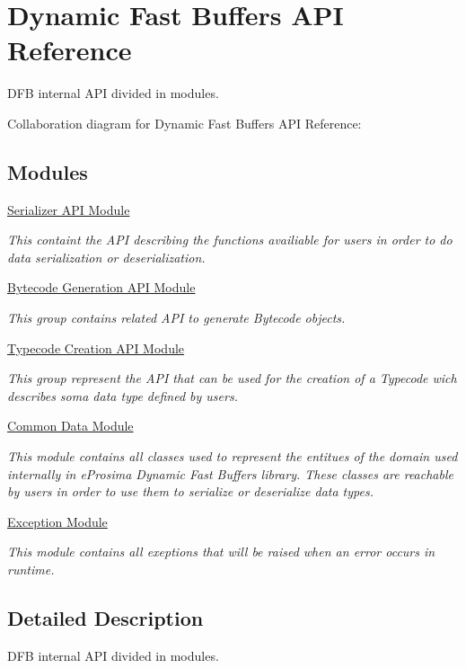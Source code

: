 \hypertarget{group___d_y_n_a_m_i_c_f_a_s_t_b_u_f_f_e_r_s_a_p_i_r_e_f_e_r_e_n_c_e}{\section{Dynamic Fast Buffers A\-P\-I Reference}
\label{group___d_y_n_a_m_i_c_f_a_s_t_b_u_f_f_e_r_s_a_p_i_r_e_f_e_r_e_n_c_e}
}


D\-F\-B internal A\-P\-I divided in modules.  


Collaboration diagram for Dynamic Fast Buffers A\-P\-I Reference\-:
\subsection*{Modules}
\begin{DoxyCompactItemize}
\item 
\hyperlink{group___s_e_r_i_a_l_i_z_e_r_a_p_i_m_o_d_u_l_e}{Serializer A\-P\-I Module}
\begin{DoxyCompactList}\small\item\em This containt the A\-P\-I describing the functions availiable for users in order to do data serialization or deserialization. \end{DoxyCompactList}\item 
\hyperlink{group___b_y_t_e_c_o_d_e_a_p_i_m_o_d_u_l_e}{Bytecode Generation A\-P\-I Module}
\begin{DoxyCompactList}\small\item\em This group contains related A\-P\-I to generate Bytecode objects. \end{DoxyCompactList}\item 
\hyperlink{group___t_y_p_e_c_o_d_e_a_p_i_m_o_d_u_l_e}{Typecode Creation A\-P\-I Module}
\begin{DoxyCompactList}\small\item\em This group represent the A\-P\-I that can be used for the creation of a Typecode wich describes soma data type defined by users. \end{DoxyCompactList}\item 
\hyperlink{group___c_o_m_m_o_n_d_a_t_a_m_o_d_u_l_e}{Common Data Module}
\begin{DoxyCompactList}\small\item\em This module contains all classes used to represent the entitues of the domain used internally in e\-Prosima Dynamic Fast Buffers library. These classes are reachable by users in order to use them to serialize or deserialize data types. \end{DoxyCompactList}\item 
\hyperlink{group___e_x_c_e_p_t_i_o_n_m_o_d_u_l_e}{Exception Module}
\begin{DoxyCompactList}\small\item\em This module contains all exeptions that will be raised when an error occurs in runtime. \end{DoxyCompactList}\end{DoxyCompactItemize}


\subsection{Detailed Description}
D\-F\-B internal A\-P\-I divided in modules. 